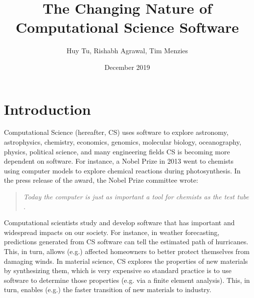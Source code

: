 \documentclass[sigconf,review,anonymous]{acmart}
\title[Changing  Nature of CS Software]{The Changing Nature of Computational Science Software}
\author{Huy Tu, Rishabh Agrawal, Tim Menzies}
\affiliation{ Computer Science, NC State, USA} \email{hqtu@ncsu.edu,  ragrawa3@ncsu.edu, timm@ieee.org}
\date{December 2019}
\newcommand{\bi}{\begin{itemize}}
\newcommand{\ei}{\end{itemize}}
\begin{document}
\maketitle
\section{Introduction}

Computational Science (hereafter, CS)
uses software   to explore
 astronomy, astrophysics, chemistry, economics, genomics, molecular biology, oceanography, physics, political science,  and many   engineering fields 
CS is becoming more dependent on software. For instance, a Nobel Prize in 2013 went to chemists using computer models to explore chemical reactions during photosynthesis. In the press release of the award, the Nobel Prize committee wrote:
\begin{quote}
{\em Today the computer is just as important a tool for chemists as the test tube \cite{nobel_2013}.}
\end{quote}

Computational scientists study and develop software that has important and widespread impacts on our society. For instance, in weather forecasting, predictions generated from CS
software can tell the estimated path of hurricanes. This, in turn,
allows (e.g.) affected homeowners to better protect themselves from
damaging winds. In material science, CS explores the properties
of new materials by synthesizing them, which is very expensive so standard practice is to use software to determine
those properties (e.g. via a finite element analysis). This, in turn, enables (e.g.) the faster transition of new materials to industry.

\end{document}
